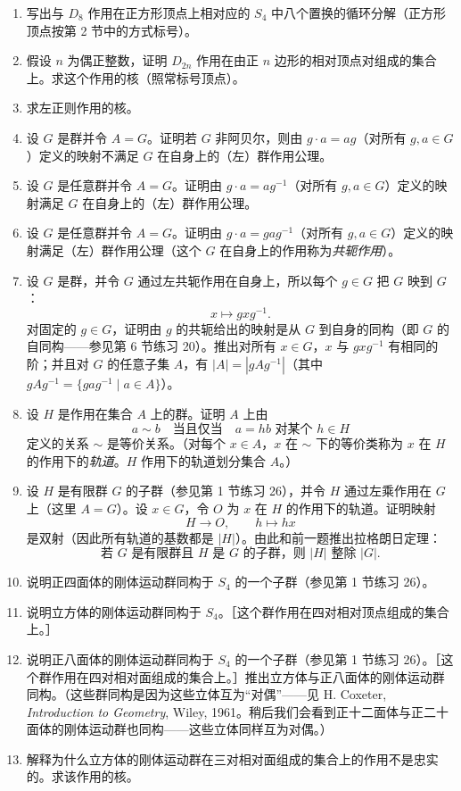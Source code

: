 \begin{enumerate}[label=\arabic*.]
\begin{enumerate}[label=(\alph*)]
    \item 对哪些 $k$，$S_n$ 在 $k$ 元子集上的作用是忠实的；
    \item 对哪些 $k$，$S_n$ 在有序 $k$ 元组上的作用是忠实的。
  \end{enumerate}
  \item 写出与 $D_8$ 作用在正方形顶点上相对应的 $S_4$ 中八个置换的循环分解（正方形顶点按第 2 节中的方式标号）。
  \item 假设 $n$ 为偶正整数，证明 $D_{2n}$ 作用在由正 $n$ 边形的相对顶点对组成的集合上。求这个作用的核（照常标号顶点）。
  \item 求左正则作用的核。
  \item 设 $G$ 是群并令 $A=G$。证明若 $G$ 非阿贝尔，则由 $g\cdot a=ag$（对所有 $g,a\in G$）定义的映射不满足 $G$ 在自身上的（左）群作用公理。
  \item 设 $G$ 是任意群并令 $A=G$。证明由 $g\cdot a=ag^{-1}$（对所有 $g,a\in G$）定义的映射满足 $G$ 在自身上的（左）群作用公理。
  \item 设 $G$ 是任意群并令 $A=G$。证明由 $g\cdot a=gag^{-1}$（对所有 $g,a\in G$）定义的映射满足（左）群作用公理（这个 $G$ 在自身上的作用称为\emph{共轭作用}）。
  \item 设 $G$ 是群，并令 $G$ 通过左共轭作用在自身上，所以每个 $g\in G$ 把 $G$ 映到 $G$：
  \[
    x\mapsto gxg^{-1}.
  \]
  对固定的 $g\in G$，证明由 $g$ 的共轭给出的映射是从 $G$ 到自身的同构（即 $G$ 的自同构——参见第 6 节练习 20）。推出对所有 $x\in G$，$x$ 与 $gxg^{-1}$ 有相同的阶；并且对 $G$ 的任意子集 $A$，有 $|A|=|gAg^{-1}|$（其中 $gAg^{-1}=\{gag^{-1}\mid a\in A\}$）。
  \item 设 $H$ 是作用在集合 $A$ 上的群。证明 $A$ 上由
  \[
    a\sim b\quad\text{当且仅当}\quad a=hb\text{ 对某个 }h\in H
  \]
  定义的关系 $\sim$ 是等价关系。（对每个 $x\in A$，$x$ 在 $\sim$ 下的等价类称为 $x$ 在 $H$ 的作用下的\emph{轨道}。$H$ 作用下的轨道划分集合 $A$。）
  \item 设 $H$ 是有限群 $G$ 的子群（参见第 1 节练习 26），并令 $H$ 通过左乘作用在 $G$ 上（这里 $A=G$）。设 $x\in G$，令 $O$ 为 $x$ 在 $H$ 的作用下的轨道。证明映射
  \[
    H\to O,\qquad h\mapsto hx
  \]
  是双射（因此所有轨道的基数都是 $|H|$）。由此和前一题推出拉格朗日定理：
  \[
    \text{若 }G\text{ 是有限群且 }H\text{ 是 }G\text{ 的子群，则 }|H|\text{ 整除 }|G|.
  \]
  \item 说明正四面体的刚体运动群同构于 $S_4$ 的一个子群（参见第 1 节练习 26）。
  \item 说明立方体的刚体运动群同构于 $S_4$。［这个群作用在四对相对顶点组成的集合上。］
  \item 说明正八面体的刚体运动群同构于 $S_4$ 的一个子群（参见第 1 节练习 26）。［这个群作用在四对相对面组成的集合上。］推出立方体与正八面体的刚体运动群同构。（这些群同构是因为这些立体互为“对偶”——见 H. Coxeter, \textit{Introduction to Geometry}, Wiley, 1961。稍后我们会看到正十二面体与正二十面体的刚体运动群也同构——这些立体同样互为对偶。）
  \item 解释为什么立方体的刚体运动群在三对相对面组成的集合上的作用不是忠实的。求该作用的核。
\end{enumerate}
